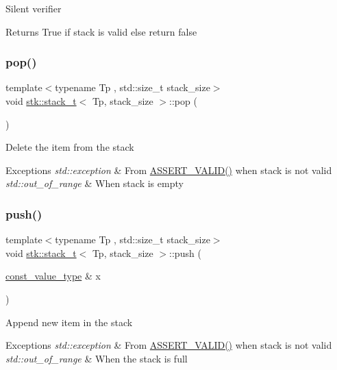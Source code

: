 Silent verifier \begin{DoxyReturn}{Returns}
True if stack is valid else return false 
\end{DoxyReturn}
\mbox{\label{classstk_1_1stack__t_a5be99b150a46b8456643cbc40bcefca8}} 
\subsubsection{\texorpdfstring{pop()}{pop()}}
{\footnotesize\ttfamily template$<$typename Tp , std\+::size\+\_\+t stack\+\_\+size$>$ \\
void \hyperlink{classstk_1_1stack__t}{stk\+::stack\+\_\+t}$<$ Tp, stack\+\_\+size $>$\+::pop (\begin{DoxyParamCaption}{ }\end{DoxyParamCaption})}

Delete the item from the stack 
\begin{DoxyExceptions}{Exceptions}
{\em std\+::exception} & From \hyperlink{stack_8h_a4ad7af85cae2910ffcf6bfbcb8278886}{A\+S\+S\+E\+R\+T\+\_\+\+V\+A\+L\+I\+D()} when stack is not valid \\
\hline
{\em std\+::out\+\_\+of\+\_\+range} & When stack is empty \\
\hline
\end{DoxyExceptions}
\mbox{\label{classstk_1_1stack__t_aad7638faa441f17e91ba9a8f5663be4c}} 
\subsubsection{\texorpdfstring{push()}{push()}}
{\footnotesize\ttfamily template$<$typename Tp , std\+::size\+\_\+t stack\+\_\+size$>$ \\
void \hyperlink{classstk_1_1stack__t}{stk\+::stack\+\_\+t}$<$ Tp, stack\+\_\+size $>$\+::push (\begin{DoxyParamCaption}\item[{\hyperlink{classstk_1_1stack__t_a27d586bc06e0faf30a2a980cd8ffd125}{const\+\_\+value\+\_\+type} \&}]{x }\end{DoxyParamCaption})}

Append new item in the stack 
\begin{DoxyExceptions}{Exceptions}
{\em std\+::exception} & From \hyperlink{stack_8h_a4ad7af85cae2910ffcf6bfbcb8278886}{A\+S\+S\+E\+R\+T\+\_\+\+V\+A\+L\+I\+D()} when stack is not valid \\
\hline
{\em std\+::out\+\_\+of\+\_\+range} & When the stack is full \\
\hline
\end{DoxyExceptions}
\mbox{\label{classstk_1_1stack__t_a50dbd2e6626510af69ba1f38882ca1b5}} 

